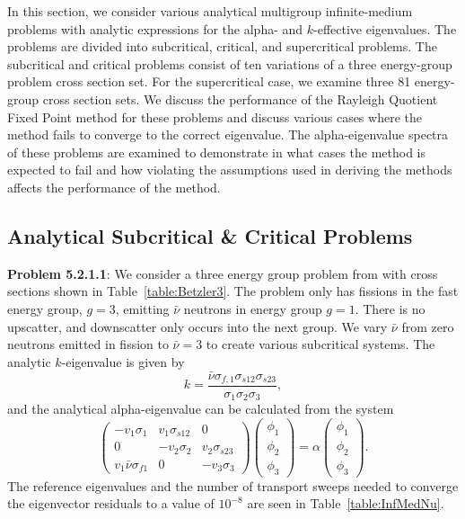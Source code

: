 In this section, we consider various analytical multigroup infinite-medium problems with analytic expressions for the alpha- and $k$-effective eigenvalues. The problems are divided into subcritical, critical, and supercritical problems. The subcritical and critical problems consist of ten variations of a three energy-group problem cross section set. For the supercritical case, we examine three 81 energy-group cross section sets. We discuss the performance of the Rayleigh Quotient Fixed Point method for these problems and discuss various cases where the method fails to converge to the correct eigenvalue. The alpha-eigenvalue spectra of these problems are examined to demonstrate in what cases the method is expected to fail and how violating the assumptions used in deriving the methods affects the performance of the method.

\subsection{Analytical Subcritical \& Critical Problems}

\textbf{Problem 5.2.1.1}: We consider a three energy group problem from \cite{Betzler2014Alpha} with cross sections shown in Table~\ref{table:Betzler3}. The problem only has fissions in the fast energy group, $g = 3$, emitting $\bar{\nu}$ neutrons in energy group $g = 1$. There is no upscatter, and downscatter only occurs into the next group. We vary $\bar{\nu}$ from zero neutrons emitted in fission to $\bar{\nu} = 3$ to create various subcritical systems. The analytic $k$-eigenvalue is given by
\begin{equation}
	k = \frac{\bar{\nu} \sigma_{f,1} \sigma_{s12} \sigma_{s23}}{\sigma_{1} \sigma_{2} \sigma_{3}},
\end{equation}
and the analytical alpha-eigenvalue can be calculated from the system
\begin{equation}
	\begin{pmatrix}
		-v_{1} \sigma_{1} & v_{1} \sigma_{s12} & 0 \\
		0 & -v_{2} \sigma_{2} & v_{2} \sigma_{s23} \\
		v_{1} \bar{\nu} \sigma_{f1} & 0 & -v_{3} \sigma_{3}
	\end{pmatrix}
	\begin{pmatrix}
		\phi_{1} \\ \phi_{2} \\ \phi_{3}
	\end{pmatrix} = 
	\alpha
	\begin{pmatrix}
		\phi_{1} \\ \phi_{2} \\ \phi_{3}
	\end{pmatrix}.
\end{equation}
The reference eigenvalues and the number of transport sweeps needed to converge the eigenvector residuals to a value of $10^{-8}$ are seen in Table~\ref{table:InfMedNu}. 

